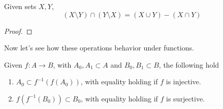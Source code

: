 \documentclass{article}
\begin{document}
    \begin{theorem}
      Given sets $X, Y$, 
      \begin{equation}
        (X \setminus Y) \cap (Y \setminus X) = (X \cup Y) - (X \cap Y)
      \end{equation}
    \end{theorem}
    \begin{proof}
      
    \end{proof} 

    Now let's see how these operations behavior under functions. 

    \begin{theorem}
      Given $f: A \rightarrow B$, with $A_0, A_1 \subset A$ and $B_0, B_1 \subset B$, the following hold 
      \begin{enumerate}
        \item $A_0 \subset f^{-1} (f(A_0))$, with equality holding if $f$ is injective. 
        \item $f(f^{-1}(B_0)) \subset B_0$, with equality holding if $f$ is surjective. 
      \end{enumerate}
    \end{theorem} 
\end{document}
